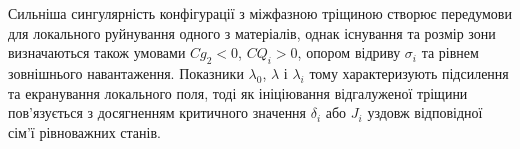 Сильніша сингулярність конфігурації з міжфазною тріщиною створює
передумови для локального руйнування одного з матеріалів, однак існування
та розмір зони визначаються також умовами $Cg_2<0$, $CQ_i>0$, опором
відриву $\sigma_i$ та рівнем зовнішнього навантаження. Показники
$\lambda_0$, $\lambda$ і $\lambda_i$ тому характеризують підсилення та
екранування локального поля, тоді як ініціювання відгалуженої тріщини
пов'язується з досягненням критичного значення $\delta_i$ або $J_i$
уздовж відповідної сім'ї рівноважних станів.
